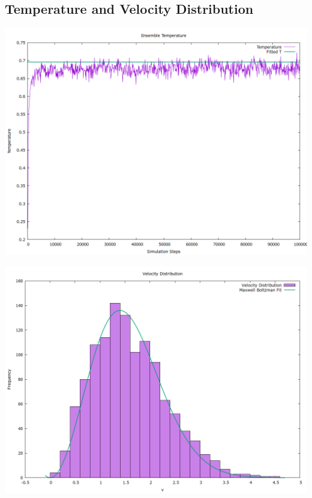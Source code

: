 \documentclass[a4paper,11pt,twoside]{article}
\begin{document}
\subsection{Temperature and Velocity Distribution}
\label{sec:org3349f3e}
\begin{center}
\includegraphics[width=.9\linewidth]{../../runs/nve_lammps_pair_style/plots/temperature.png}
\end{center}

\begin{center}
\includegraphics[width=.9\linewidth]{../../runs/nve_lammps_pair_style/plots/velocity_dist.png}
\end{center}
\end{document}
